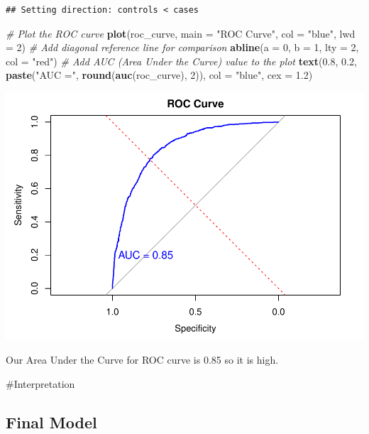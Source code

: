 \documentclass[
  twoside]{article}
\newenvironment{Shaded}{\begin{snugshade}}{\end{snugshade}}
\newcommand{\AttributeTok}[1]{\textcolor[rgb]{0.13,0.29,0.53}{#1}}
\newcommand{\CommentTok}[1]{\textcolor[rgb]{0.56,0.35,0.01}{\textit{#1}}}
\newcommand{\DecValTok}[1]{\textcolor[rgb]{0.00,0.00,0.81}{#1}}
\newcommand{\FloatTok}[1]{\textcolor[rgb]{0.00,0.00,0.81}{#1}}
\newcommand{\FunctionTok}[1]{\textcolor[rgb]{0.13,0.29,0.53}{\textbf{#1}}}
\newcommand{\NormalTok}[1]{#1}
\newcommand{\StringTok}[1]{\textcolor[rgb]{0.31,0.60,0.02}{#1}}
\begin{document}
\begin{verbatim}
## Setting direction: controls < cases
\end{verbatim}

\begin{Shaded}
\begin{Highlighting}[]
\CommentTok{\# Plot the ROC curve}
\FunctionTok{plot}\NormalTok{(roc\_curve, }\AttributeTok{main =} \StringTok{"ROC Curve"}\NormalTok{, }\AttributeTok{col =} \StringTok{"blue"}\NormalTok{, }\AttributeTok{lwd =} \DecValTok{2}\NormalTok{)}
\CommentTok{\# Add diagonal reference line for comparison}
\FunctionTok{abline}\NormalTok{(}\AttributeTok{a =} \DecValTok{0}\NormalTok{, }\AttributeTok{b =} \DecValTok{1}\NormalTok{, }\AttributeTok{lty =} \DecValTok{2}\NormalTok{, }\AttributeTok{col =} \StringTok{"red"}\NormalTok{)}
\CommentTok{\# Add AUC (Area Under the Curve) value to the plot}
\FunctionTok{text}\NormalTok{(}\FloatTok{0.8}\NormalTok{, }\FloatTok{0.2}\NormalTok{, }\FunctionTok{paste}\NormalTok{(}\StringTok{"AUC ="}\NormalTok{, }\FunctionTok{round}\NormalTok{(}\FunctionTok{auc}\NormalTok{(roc\_curve), }\DecValTok{2}\NormalTok{)), }\AttributeTok{col =} \StringTok{"blue"}\NormalTok{, }\AttributeTok{cex =} \FloatTok{1.2}\NormalTok{)}
\end{Highlighting}
\end{Shaded}

\includegraphics{Assigment2_files/figure-latex/unnamed-chunk-80-1.pdf}

Our Area Under the Curve for ROC curve is 0.85 so it is high.

\#Interpretation

\hypertarget{final-model}{%
\subsection{Final Model}\label{final-model}}
\end{document}
